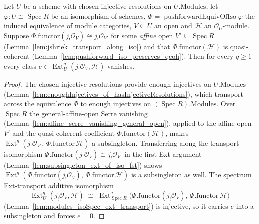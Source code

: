 \begin{lemma}\leanok
  \label{lem:ext_jShriekOU_eq_zero_of_specIso}
  Let \(U\) be a scheme with chosen injective resolutions on \(U.\mathrm{Modules}\), let
  \(\varphi : U \cong \operatorname{Spec} R\) be an isomorphism of schemes,
  \(\Phi = \operatorname{pushforwardEquivOfIso}\varphi\) the induced equivalence of module categories,
  \(V \subseteq U\) an open and \(\mathcal{H}\) an \(\mathcal{O}_U\)-module. Suppose
  \(\Phi.\mathrm{functor}(j_!\mathcal{O}_V) \cong j_!\mathcal{O}_{V'}\) for some \emph{affine} open
  \(V' \subseteq \operatorname{Spec} R\) (Lemma~\ref{lem:jshriek_transport_along_iso}) and that
  \(\Phi.\mathrm{functor}(\mathcal{H})\) is quasi-coherent
  (Lemma~\ref{lem:pushforward_iso_preserves_qcoh}). Then for every \(q \geq 1\) every class
  \(e \in \operatorname{Ext}^q_U(j_!\mathcal{O}_V, \mathcal{H})\) vanishes.
\end{lemma}
\begin{proof}
    \leanok
  The chosen injective resolutions provide enough injectives on \(U.\mathrm{Modules}\)
  (Lemma~\ref{lem:enoughInjectives_of_hasInjectiveResolutions}), which transport across the equivalence
  \(\Phi\) to enough injectives on \((\operatorname{Spec} R).\mathrm{Modules}\). Over
  \(\operatorname{Spec} R\) the general-affine-open Serre vanishing
  (Lemma~\ref{lem:affine_serre_vanishing_general_open}), applied to the affine open \(V'\) and the
  quasi-coherent coefficient \(\Phi.\mathrm{functor}(\mathcal{H})\), makes
  \(\operatorname{Ext}^q(j_!\mathcal{O}_{V'},\, \Phi.\mathrm{functor}\,\mathcal{H})\) a subsingleton.
  Transferring along the transport isomorphism
  \(\Phi.\mathrm{functor}(j_!\mathcal{O}_V) \cong j_!\mathcal{O}_{V'}\) in the first Ext-argument
  (Lemma~\ref{lem:subsingleton_ext_of_iso_fst}) shows
  \(\operatorname{Ext}^q(\Phi.\mathrm{functor}(j_!\mathcal{O}_V),\, \Phi.\mathrm{functor}\,\mathcal{H})\)
  is a subsingleton as well. The spectrum Ext-transport additive isomorphism
  \[
    \operatorname{Ext}^q_U(j_!\mathcal{O}_V, \mathcal{H})
      \;\cong\;
    \operatorname{Ext}^q_{\operatorname{Spec} R}\bigl(\Phi.\mathrm{functor}(j_!\mathcal{O}_V),\,
      \Phi.\mathrm{functor}\,\mathcal{H}\bigr)
  \]
  (Lemma~\ref{lem:modules_isoSpec_ext_transport}) is injective, so it carries \(e\) into a subsingleton
  and forces \(e = 0\).
\end{proof}

